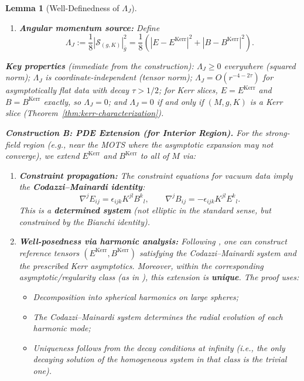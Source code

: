 \documentclass[12pt]{article}
\theoremstyle{plain}
\newtheorem{lemma}[theorem]{Lemma}
\theoremstyle{definition}
\theoremstyle{remark}
\newcommand{\bg}{\bar{g}}
\begin{document}
\begin{lemma}[Well-Definedness of $\Lambda_J$]
\begin{enumerate}[label=\textup{(\roman*)}]
    \item \textbf{Angular momentum source:} Define
    \[
    \Lambda_J := \frac{1}{8}|\mathcal{S}_{(g,K)}|^2_{\bg} = \frac{1}{8}\left(|E - E^{\mathrm{Kerr}}|^2 + |B - B^{\mathrm{Kerr}}|^2\right).
    \]
\end{enumerate}

\textbf{Key properties} (immediate from the construction): $\Lambda_J \geq 0$ everywhere (squared norm); $\Lambda_J$ is coordinate-independent (tensor norm); $\Lambda_J = O(r^{-4-2\tau})$ for asymptotically flat data with decay $\tau > 1/2$; for Kerr slices, $E = E^{\mathrm{Kerr}}$ and $B = B^{\mathrm{Kerr}}$ exactly, so $\Lambda_J = 0$; and $\Lambda_J = 0$ if and only if $(M, g, K)$ is a Kerr slice (Theorem~\ref{thm:kerr-characterization}).

\textbf{Construction B: PDE Extension (for Interior Region).}
For the strong-field region (e.g., near the MOTS where the asymptotic expansion may not converge), we extend $E^{\mathrm{Kerr}}$ and $B^{\mathrm{Kerr}}$ to all of $M$ via:
\begin{enumerate}[label=\textup{(\roman*)}]
    \item \textbf{Constraint propagation:} The constraint equations for vacuum data imply the \textbf{Codazzi--Mainardi identity}:
    \[
    \nabla^j E_{ij} = \epsilon_{ijk}K^{jl}B^k{}_l, \qquad \nabla^j B_{ij} = -\epsilon_{ijk}K^{jl}E^k{}_l.
    \]
    This is a \textbf{determined system} (not elliptic in the standard sense, but constrained by the Bianchi identity).
    
    \item \textbf{Well-posedness via harmonic analysis:} Following \cite{backdahl2010a, backdahl2010b}, one can construct reference tensors $(E^{\mathrm{Kerr}}, B^{\mathrm{Kerr}})$ satisfying the Codazzi--Mainardi system and the prescribed Kerr asymptotics. Moreover, within the corresponding asymptotic/regularity class (as in \cite{backdahl2010a, backdahl2010b}), this extension is \textbf{unique}. The proof uses:
    \begin{itemize}
        \item Decomposition into spherical harmonics on large spheres;
        \item The Codazzi--Mainardi system determines the radial evolution of each harmonic mode;
    \item Uniqueness follows from the decay conditions at infinity (i.e., the only decaying solution of the homogeneous system in that class is the trivial one).
    \end{itemize}
    

\end{enumerate}
\end{lemma}
\end{document}
